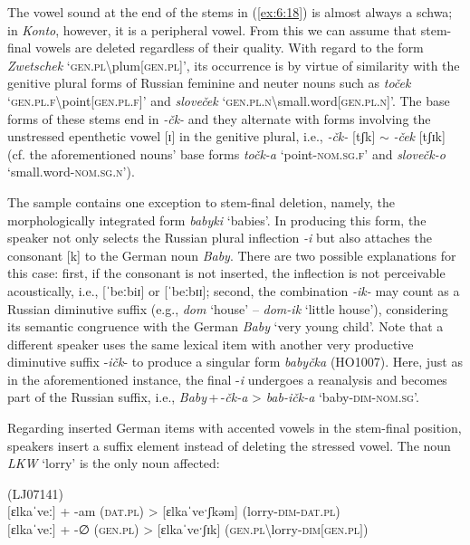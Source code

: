 \begin{sloppypar}
\noindent The vowel sound at the end of the stems in (\ref{ex:6:18}) is almost always a schwa; in \textit{Konto}, however, it is a peripheral vowel. From this we can assume that stem-final vowels are deleted regardless of their quality. With regard to the form \textit{Zwetschek} `\textsc{gen.pl}\textbackslash{}plum[\textsc{gen.pl}]', its occurrence is by virtue of similarity with the genitive plural forms of Russian feminine and neuter nouns such as \textit{toček}  `\textsc{gen.pl.f}\textbackslash point[\textsc{gen.pl.f}]' and \textit{sloveček} `\textsc{gen.pl.n}\textbackslash small.word[\textsc{gen.pl.n}]'. The base forms of these stems end in \textit{-čk-} and they alternate with forms involving the unstressed epenthetic vowel [ɪ] in the genitive plural, i.e., \textit{-čk-} [tʃk] {$\sim$} \textit{-ček} [tʃɪk] (cf. the aforementioned nouns’ base forms \textit{točk-a} `point-\textsc{nom.sg.f}' and \textit{slovečk-o} `small.word-\textsc{nom.sg.n}'). 
\end{sloppypar}

The sample contains one exception to stem-final deletion, namely, the morphologically integrated form \textit{babyki} ‘babies’. In producing this form, the speaker not only selects the Russian plural inflection \textit{-i} but also attaches the consonant [k] to the German noun \textit{Baby}. There are two possible explanations for this case: first, if the consonant is not inserted, the inflection is not perceivable acoustically, i.e., [ˈbeːbiɪ] or  [ˈbeːbɪɪ]; second, the combination \textit{-ik-} may count as a Russian diminutive suffix (e.g., \textit{dom} `house' -- \textit{dom-ik} `little house'), considering its semantic congruence with  the German \textit{Baby} ‘very young child’. Note that a different speaker uses the same lexical item with another very productive diminutive suffix -\textit{ičk}- \citep[cf.][209--210]{rusgramm-tom1} to produce a singular form \textit{babyčka} (HO1007). Here, just as in the aforementioned instance, the final -\textit{i} undergoes a reanalysis and becomes part of the Russian suffix, i.e., \textit{Baby}\,+\,-\textit{čk-a} > \textit{bab-ičk-a} `baby-\textsc{dim-nom.sg}'.

Regarding inserted German items with accented vowels in the stem-final position, speakers insert a suffix element instead of deleting the stressed vowel. The noun \textit{LKW} `lorry' is the only noun affected:

\ea
\label{ex:6:19}
(LJ07141)\\
$[$ɛlkaˈveː$]$ + -am (\textsc{dat.pl}) > [ɛlkaˈveˑʃkəm] (lorry-\textsc{dim-dat.pl})\\
$[$ɛlkaˈveː$]$ + -∅{} (\textsc{gen.pl}) > [ɛlkaˈveˑʃɪk] (\textsc{gen.pl}\textbackslash lorry-\textsc{dim}$[$\textsc{gen.pl}$]$)
\z

